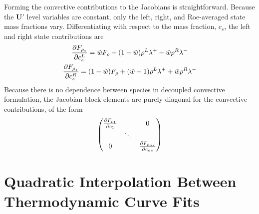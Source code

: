 Forming the convective contributions to the Jacobians is straightforward.
Because the $\mathbf{U}'$ level variables are constant, only the left, right,
and Roe-averaged state mass fractions vary.  Differentiating 
with respect to the mass fraction, $c_s$, the left and right state contributions
are
\begin{gather}
  \frac{\partial F_{\rho_s}}{\partial c^L_s} = \tilde{w} F_\rho+(1-\tilde{w})\rho^L\lambda^+ - \tilde{w} \rho^R\lambda^- \\
  \frac{\partial F_{\rho_s}}{\partial c^R_s} = (1-\tilde{w}) F_\rho+(\tilde{w}-1)\rho^L\lambda^+ + \tilde{w}\rho^R\lambda^- 
  \label{dc-sp-linearizations}
\end{gather}
Because there is no dependence between species in decoupled convective
formulation, the Jacobian block elements are purely diagonal for the convective
contributions, of the form
\begin{equation} 
  \begin{pmatrix} 
    \frac{\partial F_{\rho_1}}{\partial c_1} & & 0 \\ 
    & \ddots & \\ 
    0 & & \frac{\partial F_{\rho_{ns}}}{\partial c_{ns}}
  \end{pmatrix}
  \label{dc-diag-Jacobian}
\end{equation}

\section{Quadratic Interpolation Between Thermodynamic Curve Fits}
\label{sec:quad-cp-blending}

